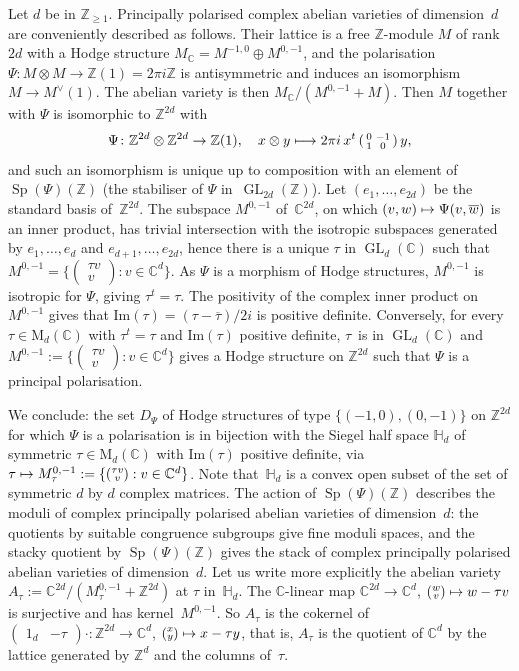 \documentclass[JEP,XML,SOM,Unicode,NoFloatCountersInSection]{cedram}
\def\mto{\mathchoice{\longmapsto}{\mapsto}{\mapsto}{\mapsto}}
\let\oldvee\vee
\renewcommand{\vee}{{\scriptscriptstyle\oldvee}}
\theoremstyle{plain}
\theoremstyle{definition}
\numberwithin{equation}{subsection}
\let\ol\overline
\renewcommand{\C}{\mathbb C}
\newcommand{\Z}{\mathbb Z}
\renewcommand{\H}{\mathbb H}
\newcommand{\rmM}{\mathrm{M}}
\renewcommand{\Im}{\mathrm{Im}}
\DeclareMathOperator{\GL}{GL}
\DeclareMathOperator{\Sp}{Sp}
\begin{document}
Let $d$ be in $\Z_{\geq1}$. Principally polarised complex abelian
varieties of dimension~$d$ are conveniently described as
follows. Their lattice is a free $\Z$-module $M$ of rank $2d$ with a
Hodge structure $M_\C=M^{-1,0}\oplus M^{0,-1}$, and the polarisation
$\Psi\colon M\otimes M\to \Z(1)=2\pi i\Z$ is antisymmetric and induces
an isomorphism $M\to M^\vee(1)$. The abelian variety is then
$M_\C/(M^{0,-1}+M)$. Then $M$ together with $\Psi$ is isomorphic to
$\Z^{2d}$ with
\[
\Psi\colon \Z^{2d}\otimes\Z^{2d}\to\Z(1),\quad x\otimes
y\mto 2\pi i\,x^t\,(\begin{smallmatrix} 0 & -1\\ 1 &
0\end{smallmatrix})\,y,
\]
and such an isomorphism is unique up to
composition with an element of~$\Sp(\Psi)(\Z)$ (the stabiliser of
$\Psi$ in~$\GL_{2d}(\Z)$). Let $(e_1,\ldots,e_{2d})$ be the standard
basis of~$\Z^{2d}$. The subspace $M^{0,-1}$ of~$\C^{2d}$, on which
$(v,w)\mto \Psi(v,\ol{w})$ is an inner product, has trivial
intersection with the isotropic subspaces generated by
$e_1,\ldots,e_d$ and $e_{d+1},\ldots,e_{2d}$, hence there is a unique
$\tau$ in $\GL_d(\C)$ such that $M^{0,-1}=\{(\substack{\tau v\\ v}) :
v\in\C^d\}$. As $\Psi$ is a morphism of Hodge structures, $M^{0,-1}$
is isotropic for $\Psi$, giving $\tau^t=\tau$. The positivity of the
complex inner product on $M^{0,-1}$ gives that
$\Im(\tau)=(\tau-\ol{\tau})/2i$ is positive definite. Conversely, for
every $\tau\in\rmM_d(\C)$ with $\tau^t=\tau$ and $\Im(\tau)$ positive
definite, $\tau$~is in $\GL_d(\C)$ and $M^{0,-1}:=\{(\substack{\tau v\\
v}) : v\in\C^d\}$ gives a Hodge structure on $\Z^{2d}$ such that
$\Psi$ is a principal polarisation.

We conclude: the set $D_\Psi$ of Hodge structures of type
$\{(-1,0),(0,-1)\}$ on $\Z^{2d}$ for which $\Psi$ is a polarisation is
in bijection with the Siegel half space $\H_d$ of symmetric
$\tau\in\rmM_d(\C)$ with $\Im(\tau)$ positive definite, via
$\tau\mto M^{0,-1}_\tau:=\{(\substack{\tau v\\ v}) :
v\in\C^d\}$. Note that~$\H_d$ is a convex open subset of the set of
symmetric $d$ by $d$ complex matrices. The action of $\Sp(\Psi)(\Z)$
describes the moduli of complex principally polarised abelian
varieties of dimension~$d$: the quotients by suitable congruence
subgroups give fine moduli spaces, and the stacky quotient by
$\Sp(\Psi)(\Z)$ gives the stack of complex principally polarised
abelian varieties of dimension~$d$. Let us write more explicitly the
abelian variety $A_\tau:=\C^{2d}/(M^{0,-1}_\tau+\Z^{2d})$ at $\tau$
in~$\H_d$. The $\C$-linear map $\C^{2d}\to\C^d$, $(\substack{w\\
v})\mto w-\tau v$ is surjective and has kernel~$M^{0,-1}$. So
$A_\tau$ is the cokernel of $(\begin{matrix} 1_d &
-\tau\end{matrix}){\cdot} \colon\Z^{2d}\to \C^d$, $(\substack{x\\
y})\mto x-\tau y$, that is, $A_\tau$ is the quotient of $\C^d$ by
the lattice generated by $\Z^d$ and the columns of~$\tau$.
\end{document}
